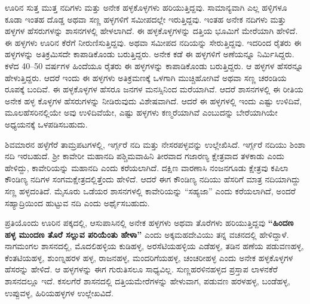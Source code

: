 ಊರಿನ ಸುತ್ತ ಮುತ್ತ ನದಿಗಳು ಮತ್ತು ಅನೇಕ ಹಳ್ಳಕೊಳ್ಳಗಳು ಹರಿಯುತ್ತಿದ್ದವು. ಸಾಮಾನ್ಯವಾಗಿ ಎಲ್ಲ ಹಳ್ಳಿಗಳೂ ಕೂಡಾ ಇಂತಹ ದೊಡ್ಡ ಅಥವಾ ಸಣ್ಣ ಹಳ್ಳಗಳಿಗೆ ಸಮೀಪದಲ್ಲೇ ಇರುತ್ತಿದ್ದವು. ಇಂತಹ ಅನೇಕ ನದಿಗಳು ಮತ್ತು ಹಳ್ಳಗಳ ಹೆಸರುಗಳನ್ನು ಶಾಸನಗಳಲ್ಲಿ ಹೇಳಲಾಗಿದೆ. ಈ ಹಳ್ಳಕೊಳ್ಳಗಳನ್ನು ದತ್ತಿಯ ಭೂಮಿಗೆ ಮೇರೆಯಾಗಿ ಹೇಳಿದೆ. ಈ ಹಳ್ಳಗಳು ಊರಿನ ಕೆರೆಗೆ ನೀರುಣಿಸುತ್ತಿದ್ದವು. ಅಥವಾ ಸಮೀಪದ ನದಿಯನ್ನು ಸೇರುತ್ತಿದ್ದವು. ಇದರಿಂದ ರೈತರು ಈ ಹಳ್ಳಗಳನ್ನು ಅತಿಕ್ರಮಿಸದೇ ಕಾಪಾಡಿಕೊಂಡು ಬರುತ್ತಿದ್ದರು. ಅನೇಕ ಕಡೆ ಈ ಹಳ್ಳಗಳಿಗೆ ಅಣೆಯನ್ನೂ ನಿರ್ಮಿಸಿದ್ದರು. ಕಳೆದ 40–50 ವರ್ಷಗಳ ಹಿಂದೆಯೂ ರೈತರು ಈ ಹಳ್ಳಗಳನ್ನು ಕಾಪಾಡಿಕೊಂಡು ಬರುತ್ತಿದ್ದರು. ಆ ಹಳ್ಳಗಳ ಹೆಸರನ್ನೂ ಹೇಳುತ್ತಿದ್ದರು. ಆದರೆ ಇಂದು ಈ ಹಳ್ಳಗಳು ಅತಿಕ್ರಮಣಕ್ಕೆ ಒಳಗಾಗಿ ಮುಚ್ಚಿಹೋಗಿವೆ ಅಥವಾ ಸಣ್ಣ ಚರಂಡಿಯ ರೂಪಕ್ಕೆ ಬಂದಿವೆ. ಈ ಹಳ್ಳಕೊಳ್ಳಗಳ ಹೆಸರೂ ಜನಗಳ ಮನಸ್ಸಿನಿಂದ ಮರೆಯಾಗಿವೆ. ಆದರೆ ಶಾಸನಗಳಲ್ಲಿ ಈ ರೀತಿಯ ಅನೇಕ ಹಳ್ಳ ಕೊಳ್ಳಗಳ ಹೆಸರುಗಳನ್ನು ನೀಡಿರುವುದು ವಿಶೇಷವಾಗಿದೆ. ಆದರೆ ಈ ಹಳ್ಳಗಳಲ್ಲಿ ಇಂದು ಎಷ್ಟು ಉಳಿದಿವೆ, ಮೂಲಹೆಸರಿನಲ್ಲಿಯೇ ಅವು ಉಳಿದಿವೆಯೇ, ಎಷ್ಟು ಹಳ್ಳಗಳು ಕಣ್ಮರೆಯಾಗಿವೆ ಎಂಬುದನ್ನು ಬೇರೆಯಾಗಿಯೇ ಅಧ್ಯಯನಕ್ಕೆ ಒಳಪಡಿಸಬಹುದು.

ಶಿವಮಾರನ ಹಳ್ಳೆಗೆರೆ ತಾಮ್ರಪಟಗಳಲ್ಲಿ, ಇರ್ಗ್ಗರೆ ನದಿ ಮತ್ತು ನೇಸರಪಳ್ಳವನ್ನು ಉಲ್ಲೇಖಿಸಿದೆ. ಇರ್ಗ್ಗರೆ ನದಿಯು ಶಿಂಶಾ ನದಿ ಇರಬಹುದೆ. ಶ‍್ರೀ ಕಾವೇರೀ ಮಹಾನದಿ ಪಶ್ಚಿಮವಾಹಿನಿ ತೀರವಾದ ಗಜಾರಣ್ಯ ಕ್ಷೇತ್ರವಾದ ತಳಕಾಡು ಎಂದು ಹೇಳಿದ್ದು, ಕಾವೇರಿಯನ್ನು ಮಹಾನದಿ ಎಂದು ಕರೆಯಲಾಗಿದೆ. ದಕ್ಷಿಣ ವಾರಣಾಸಿ ನಂಜನಗೂಡು ಕ್ಷೇತ್ರವು ಕಪಿಲಾ ಕೌಂಡಿಣ್ಯ ನದಿಗಳ ಸಂಗಮಕ್ಷೇತ್ರದಲ್ಲಿತ್ತೆಂದು ಹೇಳಿದೆ. ಆದರೆ ಈಗ ಕೌಂಡಿಣ್ಯ ನದಿಯು ಹೆಸರಿಗೆ ಮಾತ್ರ ನದಿಯಾಗಿದ್ದು ಸಣ್ಣ ಹಳ್ಳದಂತಿದೆ. ಮೈಸೂರು ಒಡೆಯರ ಶಾಸನಗಳಲ್ಲಿ ಕಾವೇರಿಯನ್ನು “ಸಹ್ಯಜಾ” ಎಂದು ಕರೆಯಲಾಗಿದೆ, ಅಂದರೆ ಸಹ್ಯಾದ್ರಿಯಿಂದ ಹುಟ್ಟುವ ನದಿ ಎಂದು ಅರ್ಥೈಸಬಹುದು.

ಪ್ರತಿಯೊಂದು ಊರಿನ ಪಕ್ಕದಲ್ಲಿ, ಆಸುಪಾಸಿನಲ್ಲಿ ಅನೇಕ ಹಳ್ಳಗಳು ಅಥವಾ ತೊರೆಗಳು ಹರಿಯುತ್ತಿದ್ದವು \textbf{“ಹಿಂದಣ ಹಳ್ಳ ಮುಂದಣ ತೊರೆ ಸಲ್ಲುವ ಪರಿಯೆಂತು ಹೇಳಾ”} ಎಂದು ಅಕ್ಕಮಹದೇವಿಯು ತನ್ನ ವಚನದಲ್ಲಿ ಹೇಳಿದ್ದಾಳೆ. ನಾಗಮಂಗಲ ಶಾಸನದಲ್ಲಿ, ಮೊದಲಿಹಳ್ಳಿಯ ಕುಡಿಹಳ್ಳ, ಅರಸೆಟಿಯಹಳ್ಳಿಯ ಎಡೆಹಳ್ಳ, ತಡಿನ ಹಣೆಯ ಪಡುವಣಹಳ್ಳ, ಕೆಂತಟಿಯಹಳ್ಳ, ಶುಂಣ್ನಹರಳ ಹಳ್ಳ, ರಾಜನಹಳ್ಳ, ಮಂದರಿಗೆಯಹಳ್ಳ, ಚಂಚರೀಹಳ್ಳ ಎಂದು ಅನೇಕ ಹಳ್ಳಕೊಳ್ಳಗಳ ಹೆಸರನ್ನು ಹೇಳಿದೆ. ಆ ಹಳ್ಳಗಳನ್ನು ಈಗ ಗುರುತಿಸಲೂ ಸಾಧ್ಯವಿಲ್ಲ. ಸುಣ್ಣಹರಳಿನಹಳ್ಳದ ಪ್ರಸ್ತಾಪ ಲಾಳನಕೆರೆ ಶಾಸನದಲ್ಲೂ ಇದೆ. ಕಸಲಗೆರೆ ಶಾಸನದಲ್ಲಿ ದತ್ತಿಯಮೇರೆಗಳನ್ನು ಹೇಳುವಾಗ, ಪಡುವಣ ಹರಳಹಳ್ಳ, ಬಂಡೆಹಳ್ಳ, ಉಪ್ಪುವಳ್ಳ, ಹಿರಿಯಹಳ್ಳಗಳ ಉಲ್ಲೇಖವಿದೆ.

